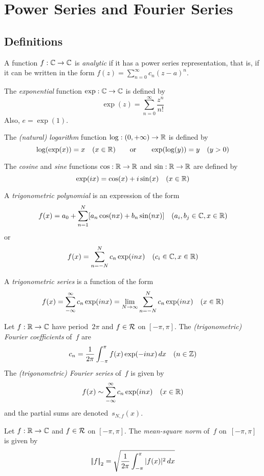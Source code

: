 %
%
%
\section{Power Series and Fourier Series}
\subsection*{Definitions}
\begin{defn}
A function \(f:\mathbb{C}\to\mathbb{C}\) is \emph{analytic} if it has a power series representation, that is, if it can be written in the form \(f(z)=\sum_{n=0}^\infty c_n(z-a)^n\).
\end{defn}
\begin{defn}
The \emph{exponential} function \(\exp:\mathbb{C}\to\mathbb{C}\) is defined by
\[\exp(z)=\sum_{n=0}^\infty\frac{z^n}{n!}\]
Also, \(e=\exp(1)\).
\end{defn}
\begin{defn}
The \emph{(natural) logarithm} function \(\log:(0,+\infty)\to\mathbb{R}\) is defined by
\[\log(\exp(x))=x\quad(x\in\mathbb{R})\qquad\text{or}\qquad\exp(\log(y))=y\quad(y>0)\]
\end{defn}
\begin{defn}
The \emph{cosine} and \emph{sine} functions \(\cos:\mathbb{R}\to\mathbb{R}\) and \(\sin:\mathbb{R}\to\mathbb{R}\) are defined by
\[\exp(ix)=\cos(x)+i\sin(x)\quad(x\in\mathbb{R})\]
\end{defn}
\begin{defn}
A \emph{trigonometric polynomial} is an expression of the form
\[f(x)=a_0+\sum_{n=1}^N[a_n\cos(nx)+b_n\sin(nx)]\quad(a_i,b_j\in\mathbb{C},x\in\mathbb{R})\]
or
\[f(x)=\sum_{n=-N}^N c_n\exp(inx)\quad(c_i\in\mathbb{C},x\in\mathbb{R})\]
\end{defn}
\begin{defn}
A \emph{trigonometric series} is a function of the form
\[f(x)=\sum_{-\infty}^\infty c_n\exp(inx)=\lim_{N\to\infty}\sum_{n=-N}^N c_n\exp(inx)\quad(x\in\mathbb{R})\]
\end{defn}
\begin{defn}
Let \(f:\mathbb{R}\to\mathbb{C}\) have period~\(2\pi\) and \(f\in\mathcal{R}\) on \([-\pi,\pi]\). The \emph{(trigonometric) Fourier coefficients} of~\(f\) are
\[c_n=\frac{1}{2\pi}\int_{-\pi}^\pi f(x)\exp(-inx)\,dx\quad(n\in\mathbb{Z})\]
The \emph{(trigonometric) Fourier series} of~\(f\) is given by
\[f(x)\sim\sum_{-\infty}^\infty c_n\exp(inx)\quad(x\in\mathbb{R})\]
and the partial sums are denoted~\(s_{N,f}(x)\).
\end{defn}
\begin{defn}
Let \(f:\mathbb{R}\to\mathbb{C}\) and \(f\in\mathcal{R}\) on \([-\pi,\pi]\). The \emph{mean-square norm} of~\(f\) on~\([-\pi,\pi]\) is given by
\[\left|\!\left|{f}\right|\!\right|_2=\sqrt{\frac{1}{2\pi}\int_{-\pi}^\pi|{f(x)}|^2\,dx}\]
\end{defn}


